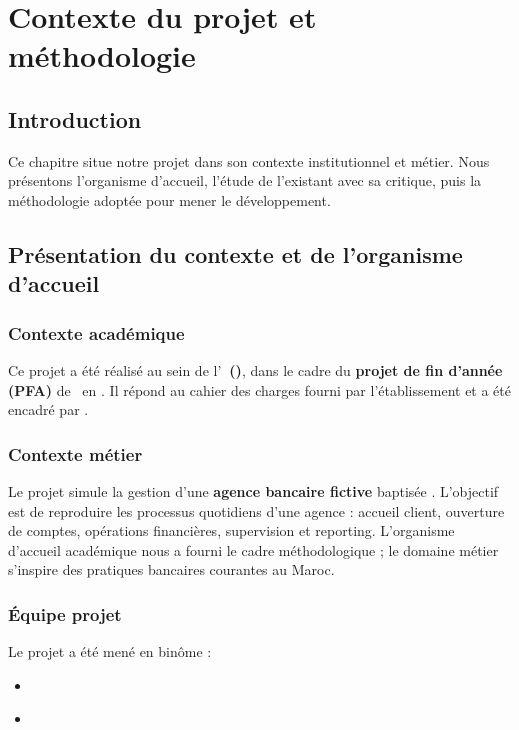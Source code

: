 \chapter{Contexte du projet et méthodologie}
\label{ch:contexte}

\section{Introduction}

Ce chapitre situe notre projet dans son contexte institutionnel et métier. Nous présentons l'organisme d'accueil, l'étude de l'existant avec sa critique, puis la méthodologie adoptée pour mener le développement.

\section{Présentation du contexte et de l'organisme d'accueil}

\subsection{Contexte académique}

Ce projet a été réalisé au sein de l'\textbf{\ecole\ (\villeecole)}, dans le cadre du \textbf{projet de fin d'année (PFA)} de \niveau\ en \filiere. Il répond au cahier des charges fourni par l'établissement et a été encadré par \encadrante.

\subsection{Contexte métier}

Le projet simule la gestion d'une \textbf{agence bancaire fictive} baptisée \textbf{\nomapplication}. L'objectif est de reproduire les processus quotidiens d'une agence : accueil client, ouverture de comptes, opérations financières, supervision et reporting. L'organisme d'accueil académique nous a fourni le cadre méthodologique ; le domaine métier s'inspire des pratiques bancaires courantes au Maroc.

\subsection{Équipe projet}

Le projet a été mené en binôme :
\begin{itemize}[leftmargin=*]
    \item \textbf{\etudianteun}
    \item \textbf{\etudiantedeux}
\end{itemize}

